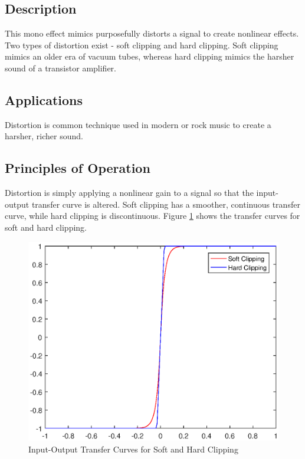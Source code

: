 \subsection{Description}
This mono effect mimics purposefully distorts a signal to create nonlinear effects. Two types of distortion exist - soft clipping and hard clipping. Soft clipping mimics an older era of vacuum tubes, whereas hard clipping mimics the harsher sound of a transistor amplifier.

\subsection{Applications}
Distortion is common technique used in modern or rock music to create a harsher, richer sound.

\subsection{Principles of Operation}
Distortion is simply applying a nonlinear gain to a signal so that the input-output transfer curve is altered. Soft clipping has a smoother, continuous transfer curve, while hard clipping is discontinuous. Figure \ref{fig:distortion-transfer-curves} shows the transfer curves for soft and hard clipping.
\begin{figure}[ht]
    \centering
    \includegraphics[scale=0.6]{distortion-transfer-curves.eps}
    \caption{Input-Output Transfer Curves for Soft and Hard Clipping}
    \label{fig:distortion-transfer-curves}
\end{figure}
